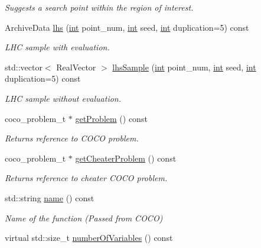 \begin{DoxyCompactItemize}
\begin{DoxyCompactList}\small\item\em Suggests a search point within the region of interest. \end{DoxyCompactList}\item 
Archive\+Data \hyperlink{classCOCOfunc_a58a3396eaf1270cbafa023237e44266d}{lhs} (\hyperlink{classint}{int} point\+\_\+num, \hyperlink{classint}{int} seed, \hyperlink{classint}{int} duplication=5) const
\begin{DoxyCompactList}\small\item\em L\+HC sample with evaluation. \end{DoxyCompactList}\item 
std\+::vector$<$ Real\+Vector $>$ \hyperlink{classCOCOfunc_ab45f933b1b59a3d0be4ce9fa83bc307e}{lhs\+Sample} (\hyperlink{classint}{int} point\+\_\+num, \hyperlink{classint}{int} seed, \hyperlink{classint}{int} duplication=5) const
\begin{DoxyCompactList}\small\item\em L\+HC sample without evaluation. \end{DoxyCompactList}\item 
coco\+\_\+problem\+\_\+t $\ast$ \hyperlink{classCOCOfunc_a8af39fc2cc018f4ff0343c613d8132c3}{get\+Problem} () const\hypertarget{classCOCOfunc_a8af39fc2cc018f4ff0343c613d8132c3}{}\label{classCOCOfunc_a8af39fc2cc018f4ff0343c613d8132c3}

\begin{DoxyCompactList}\small\item\em Returns reference to C\+O\+CO problem. \end{DoxyCompactList}\item 
coco\+\_\+problem\+\_\+t $\ast$ \hyperlink{classCOCOfunc_aaed270701e406fe2c3bc8e86ac69d3b3}{get\+Cheater\+Problem} () const\hypertarget{classCOCOfunc_aaed270701e406fe2c3bc8e86ac69d3b3}{}\label{classCOCOfunc_aaed270701e406fe2c3bc8e86ac69d3b3}

\begin{DoxyCompactList}\small\item\em Returns reference to cheater C\+O\+CO problem. \end{DoxyCompactList}\item 
std\+::string \hyperlink{classCOCOfunc_ac62752306f9fd69cc0b50b38673ee16f}{name} () const\hypertarget{classCOCOfunc_ac62752306f9fd69cc0b50b38673ee16f}{}\label{classCOCOfunc_ac62752306f9fd69cc0b50b38673ee16f}

\begin{DoxyCompactList}\small\item\em Name of the function (Passed from C\+O\+CO) \end{DoxyCompactList}\item 
virtual std\+::size\+\_\+t \hyperlink{classCOCOfunc_a8690a176427c8d17fe12b183dfa205fd}{number\+Of\+Variables} () const\hypertarget{classCOCOfunc_a8690a176427c8d17fe12b183dfa205fd}{}\label{classCOCOfunc_a8690a176427c8d17fe12b183dfa205fd}


\end{DoxyCompactItemize}
